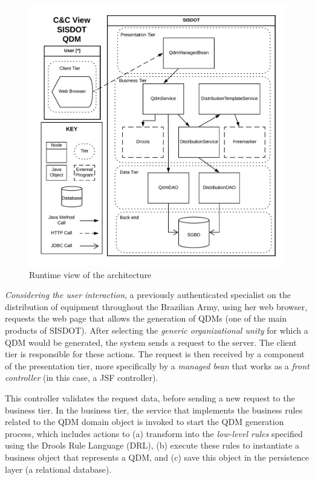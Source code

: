 \begin{figure}[!ht] %
    \hspace*{-0.55cm}
	\includegraphics[scale=0.54]{img/runtimeView_qdm.png}
	\caption{Runtime view of the architecture} 
	\label{fig:runtime_qdm}
\end{figure}

\emph{Considering the user interaction}, a previously authenticated specialist on the distribution of equipment throughout the Brazilian Army, using her web browser, requests the web page that allows the generation of QDMs (one of the main products of SISDOT). 
After selecting the \emph{generic organizational unity} for which a QDM would be generated, the system sends a request to the server. The client tier is responsible for these actions. The request is then received by a component of the presentation tier, more specifically by a \emph{managed bean} that works as a \emph{front controller} (in this case, a JSF controller). 

This controller validates the request data, before sending a new request to the business tier. In the business tier, the service 
that implements the business rules related to the QDM domain object is invoked to start the QDM generation process, which includes actions to (a) transform \callers into the \emph{low-level rules} specified using the Drools Rule Language (DRL), (b) execute these rules to instantiate a business object that represents a QDM, and (c) save this object in the persistence layer (a relational database). 

